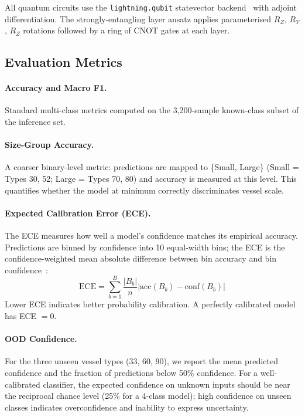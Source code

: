 \documentclass[journal]{IEEEtran}
\begin{document}
All quantum circuits use the \texttt{lightning.qubit} statevector
backend~\cite{pennylane2018} with adjoint differentiation. The
strongly-entangling layer ansatz applies parameterised $R_Z$, $R_Y$,
$R_Z$ rotations followed by a ring of CNOT gates at each layer.

\subsection{Evaluation Metrics}
\label{sec:metrics}

\paragraph{Accuracy and Macro F1.} Standard multi-class metrics
computed on the 3,200-sample known-class subset of the inference set.

\paragraph{Size-Group Accuracy.} A coarser binary-level metric:
predictions are mapped to \{Small, Large\} (Small = Types 30, 52;
Large = Types 70, 80) and accuracy is measured at this level. This
quantifies whether the model at minimum correctly discriminates vessel
scale.

\paragraph{Expected Calibration Error (ECE).} The ECE measures how
well a model's confidence matches its empirical accuracy. Predictions
are binned by confidence into 10 equal-width bins; the ECE is the
confidence-weighted mean absolute difference between bin accuracy and
bin confidence~\cite{guo2017calibration}:
\begin{equation}
  \text{ECE} = \sum_{b=1}^{B} \frac{|B_b|}{n}
  \left| \text{acc}(B_b) - \text{conf}(B_b) \right|
  \label{eq:ece}
\end{equation}
Lower ECE indicates better probability calibration. A perfectly
calibrated model has ECE $= 0$.

\paragraph{OOD Confidence.} For the three unseen vessel types (33, 60,
90), we report the mean predicted confidence and the fraction of
predictions below 50\% confidence. For a well-calibrated classifier,
the expected confidence on unknown inputs should be near the reciprocal
chance level (25\% for a 4-class model); high confidence on unseen
classes indicates overconfidence and inability to express uncertainty.
\end{document}
